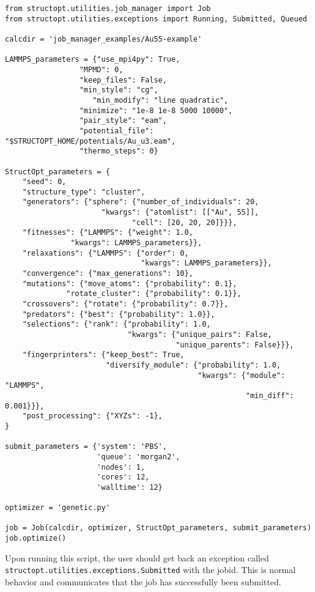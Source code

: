 \documentclass[11pt]{article}
\begin{document}
\begin{verbatim}
from structopt.utilities.job_manager import Job
from structopt.utilities.exceptions import Running, Submitted, Queued

calcdir = 'job_manager_examples/Au55-example'

LAMMPS_parameters = {"use_mpi4py": True,
	             "MPMD": 0,
	             "keep_files": False,
	             "min_style": "cg",
                    "min_modify": "line quadratic",
	             "minimize": "1e-8 1e-8 5000 10000",
	             "pair_style": "eam",
	             "potential_file": "$STRUCTOPT_HOME/potentials/Au_u3.eam",
	             "thermo_steps": 0}

StructOpt_parameters = {
    "seed": 0,
    "structure_type": "cluster",
    "generators": {"sphere": {"number_of_individuals": 20,
		              "kwargs": {"atomlist": [["Au", 55]],
			                 "cell": [20, 20, 20]}}},
    "fitnesses": {"LAMMPS": {"weight": 1.0,
	           "kwargs": LAMMPS_parameters}},
    "relaxations": {"LAMMPS": {"order": 0,
                               "kwargs": LAMMPS_parameters}},
    "convergence": {"max_generations": 10},
    "mutations": {"move_atoms": {"probability": 0.1},
	          "rotate_cluster": {"probability": 0.1}},
    "crossovers": {"rotate": {"probability": 0.7}},
    "predators": {"best": {"probability": 1.0}},
    "selections": {"rank": {"probability": 1.0,
                            "kwargs": {"unique_pairs": False,
                                       "unique_parents": False}}},
    "fingerprinters": {"keep_best": True,
                       "diversify_module": {"probability": 1.0,
                                            "kwargs": {"module": "LAMMPS",
                                                       "min_diff": 0.001}}},
    "post_processing": {"XYZs": -1},
}

submit_parameters = {'system': 'PBS',
                     'queue': 'morgan2',
                     'nodes': 1,
                     'cores': 12,
                     'walltime': 12}

optimizer = 'genetic.py'

job = Job(calcdir, optimizer, StructOpt_parameters, submit_parameters)
job.optimize()
\end{verbatim}

Upon running this script, the user should get back an exception called \texttt{structopt.utilities.exceptions.Submitted} with the jobid. This is normal behavior and communicates that the job has successfully been submitted.
\end{document}

